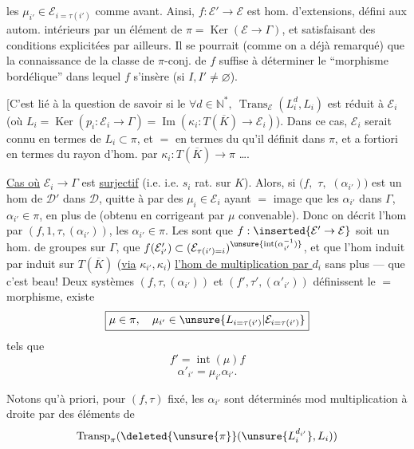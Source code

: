 

les $\mu_{i'}\in\mathcal E_{i=\tau(i')}$ comme avant. Ainsi, $f:\mathcal E'\to\mathcal E$ est   hom. d'extensions, défini aux autom. intérieurs par un élément de $\pi=\operatorname{Ker}(\mathcal E\to\Gamma)$, et satisfaisant des conditions explicitées par ailleurs.
Il se pourrait (comme on a déjà remarqué) que la connaissance de la classe de $\pi$-conj. de $f$ suffise à déterminer le ``morphisme bordélique'' dans lequel $f$ s'insère (si $I,I'\ne\varnothing$).

[C'est lié à la question de savoir si le  $\forall d\in\mathbb N^*,\ \operatorname{Trans}_{\mathcal E}(L_i^d,L_i)$ est réduit à $\mathcal E_i$ (où $L_i=\operatorname{Ker}(p_i:\mathcal E_i\to\Gamma)=\operatorname{Im}(\kappa_i:T(\overline K)\to\mathcal E_i)$).
Dans ce cas, $\mathcal E_i$ serait connu en termes de $L_i\subset\pi$, et $=$ en termes du  qu'il définit dans $\pi$, et a fortiori en termes du rayon d'hom.  par $\kappa_i:T(\overline K)\to\pi$ \ldots.



\uline{Cas où}  $\mathcal E_i\to\Gamma$ est \uline{surjectif} (i.e.   i.e. $s_i$ rat. sur $K$).
Alors, si $(f,$ \deleted{\unsure{$\alpha$,}} $\tau,$  $(\alpha_{i'}))$ est un hom de $\mathcal D'$ dans $\mathcal D$,  quitte à   par des $\mu_i\in\mathcal E_i$ ayant $=$ image que les $\alpha_{i'}$ dans $\Gamma$,  $\alpha_{i'}\in\pi$, en plus de  (obtenu en corrigeant par $\mu$ convenable).
Donc on décrit l'hom  par $(f,1,\tau,(\alpha_{i'}))$, les $\alpha_{i'}\in\pi$. Les    sont que $f:\inserted{\mathcal E'\to\mathcal E}$ soit un hom. de groupes sur $\Gamma$, que  $f(\mathcal E'_{i'})\subset(\mathcal E_{\tau(i')=i})^{\unsure{\operatorname{int}(\alpha_{i'}^{-1})}}$, et que l'hom induit  par    induit sur $T(\overline K)$ (\uline{via} $\kappa_{i'},\kappa_i$) \uline{l'hom de multiplication par $d_i$} sans plus --- que c'est beau!
Deux systèmes $(f,\tau,(\alpha_{i'}))$ et $(f',\tau',(\alpha'_{i'}))$ définissent le $=$ morphisme,   existe
\[
 \boxed{\mu\in\pi,\quad\mu_{i'}\in\unsure{L_{i=\tau(i')}|\mathcal E_{i=\tau(i')}}}
\]
tels que
\[
 f'=\operatorname{int}(\mu)f
\]
\[
 \alpha'_{i'}=\mu_{i'}\alpha_{i'}.
\]

 Notons qu'à priori, pour $(f,\tau)$ fixé, les $\alpha_{i'}$ sont déterminés mod multiplication à droite par des éléments de
\[
 \operatorname{Transp}_{\pi}(\deleted{\unsure{\pi}}(\unsure{L_i^{d_{i'}}},L_i))
\]


